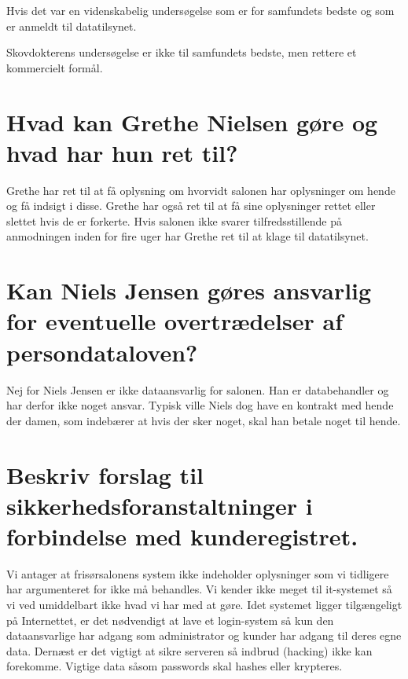 \documentclass{article}
\begin{document}
Hvis det var en videnskabelig undersøgelse som er for samfundets bedste og som er anmeldt til datatilsynet.

Skovdokterens undersøgelse er ikke til samfundets bedste, men rettere et kommercielt formål.

\section{Hvad kan Grethe Nielsen gøre og hvad har hun ret til?}
Grethe har ret til at få oplysning om hvorvidt salonen har oplysninger om hende og få indsigt i disse. Grethe har også ret til at få sine oplysninger rettet eller slettet hvis de er forkerte. Hvis salonen ikke svarer tilfredsstillende på anmodningen inden for fire uger har Grethe ret til at klage til datatilsynet.

\section{Kan Niels Jensen gøres ansvarlig for eventuelle overtrædelser af persondataloven?}
Nej for Niels Jensen er ikke dataansvarlig for salonen. Han er databehandler og har derfor ikke noget ansvar.
Typisk ville Niels dog have en kontrakt med hende der damen, som indebærer at hvis der sker noget, skal han betale noget til hende.

\section{Beskriv forslag til sikkerhedsforanstaltninger i forbindelse med kunderegistret.}

Vi antager at frisørsalonens system ikke indeholder oplysninger som vi tidligere har argumenteret for ikke må behandles. Vi kender ikke meget til it-systemet så vi ved umiddelbart ikke hvad vi har med at gøre. Idet systemet ligger tilgængeligt på Internettet, er det nødvendigt at lave et login-system så kun den dataansvarlige har adgang som administrator og kunder har adgang til deres egne data. Dernæst er det vigtigt at sikre serveren så indbrud (hacking) ikke kan forekomme. Vigtige data såsom passwords skal hashes eller krypteres.
\end{document}
